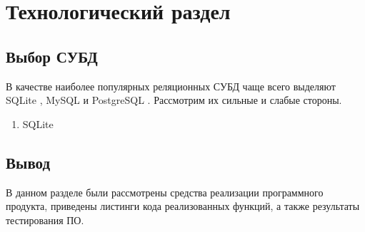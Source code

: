 \chapter{Технологический раздел}



\section{Выбор СУБД} 
В качестве наиболее популярных реляционных СУБД чаще всего выделяют SQLite \cite{sqlite}, MySQL \cite{mysql} и PostgreSQL \cite{postgres}. Рассмотрим их сильные и слабые стороны.

\begin{enumerate}
	\item SQLite
\end{enumerate}

\section*{Вывод}
В данном разделе были рассмотрены средства реализации программного продукта, приведены листинги кода реализованных функций, а также результаты тестирования ПО.